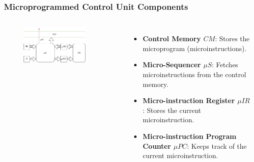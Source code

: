\begin{frame}[fragile]
    \frametitle{Microprogrammed Control Unit Components}
    \begin{columns}
        \begin{figure}
            \centering
            \includegraphics[width=0.8\textwidth]{media/mpcuarchitecture.png}
        \end{figure}
        \begin{itemize}
            \item \textbf{Control Memory $CM$}: Stores the microprogram (microinstructions).
            \item \textbf{Micro-Sequencer $\mu S$}: Fetches microinstructions from the control memory.
            \item \textbf{Micro-instruction Register $\mu IR$}: Stores the current microinstruction.
            \item \textbf{Micro-instruction Program Counter $\mu PC$}: Keeps track of the current microinstruction.
        \end{itemize}
    \end{columns}
\end{frame}

